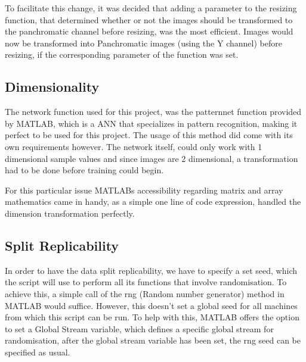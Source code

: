 To facilitate this change, it was decided that adding a parameter to the resizing function, that determined whether or not the images should be transformed to the panchromatic channel before resizing, was the most efficient. Images would now be transformed into Panchromatic images (using the Y channel) before resizing, if the corresponding parameter of the function was set. 
\subsection{Dimensionality}
The network function used for this project, was the patternnet function provided by MATLAB, which is a ANN that specializes in pattern recognition, making it perfect to be used for this project. The usage of this method did come with its own requirements however. The network itself, could only work with 1 dimensional sample values and since images are 2 dimensional, a transformation had to be done before training could begin.

For this particular issue MATLABs accessibility regarding matrix and array mathematics came in handy, as a simple one line of code expression, handled the dimension transformation perfectly.

\subsection{Split Replicability}
In order to have the data split replicability, we have to specify a set seed, which the script will use to perform all its functions that involve randomisation. To achieve this, a simple call of the rng (Random number generator) method in MATLAB would suffice. However, this doesn't set a global seed for all machines from which this script can be run. To help with this, MATLAB offers the option to set a Global Stream variable, which defines a specific global stream for randomisation, after the global stream variable has been set, the rng seed can be specified as usual.


